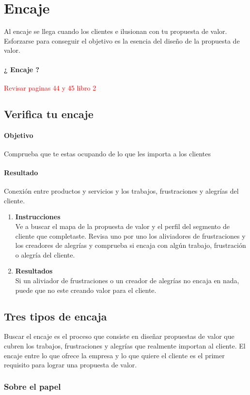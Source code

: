 \documentclass[11pt]{book}
\begin{document}
\section{Encaje}
Al encaje se llega cuando los clientes e ilusionan con tu propuesta de valor. Esforzarse para conseguir el objetivo es la esencia del diseño de la propuesta de valor.
\paragraph{¿ Encaje ?}
\textcolor{red}{Revisar paginas 44 y 45 libro 2}
\subsection{Verifica tu encaje}
\paragraph{Objetivo}
Comprueba que te estas ocupando de lo que les importa a los clientes
\paragraph{Resultado}
Conexión entre productos y servicios y los trabajos, frustraciones y alegrías del cliente.
\begin{enumerate}
\item \textbf{Instrucciones}\\
Ve a buscar el mapa de la propuesta de valor y el perfil del segmento de cliente que completaste. Revisa uno por uno los aliviadores de frustraciones y los creadores de alegrías y comprueba si encaja con algún trabajo, frustración o alegría del cliente.
\item \textbf{Resultados}\\
Si un aliviador de frustraciones o un creador de alegrías no encaja en nada, puede que no este creando valor para el cliente.
\end{enumerate}
\subsection{Tres tipos de encaja}
Buscar el encaje es el proceso que consiste en diseñar propuestas de valor que cubren los trabajos, frustraciones y alegrías que realmente importan al cliente. El encaje entre lo que ofrece la empresa y lo que quiere el cliente es el primer requisito para lograr una propuesta de valor.
\subsubsection{Sobre el papel}
\end{document}
